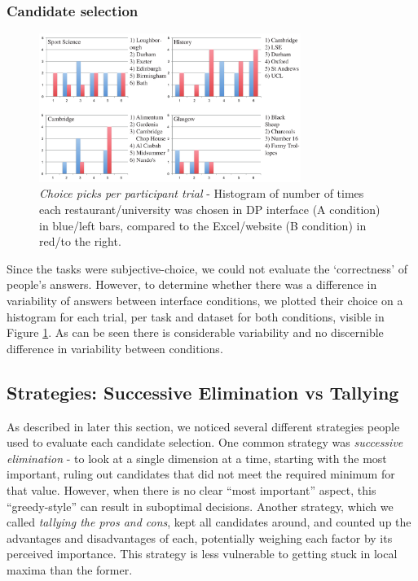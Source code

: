 \documentclass{sigchi}
\begin{document}
\subsubsection{Candidate selection}

\begin{figure}[htb]
\begin{center}
\includegraphics[width=8.5cm]{img/results}
\caption{\emph{Choice picks per participant trial} - Histogram of number of times each restaurant/university was chosen in DP interface (A condition) in blue/left bars, compared to the Excel/website (B condition) in red/to the right.}
\label{fig:chosen_results}
\end{center}
\end{figure}

Since the tasks were subjective-choice, we could not evaluate the `correctness' of people's answers.  However, to determine whether there was a difference in variability of answers between interface conditions, we plotted their choice on a histogram for each trial, per task and dataset for both conditions, visible in Figure \ref{fig:chosen_results}.  As can be seen there is considerable variability and no discernible difference in variability between conditions.  

\subsection{Strategies: Successive Elimination vs Tallying}
As described in later this section, we noticed several different strategies people used to evaluate each candidate selection. One common strategy was \emph{successive elimination} - to look at a single dimension at a time, starting with the most important, ruling out candidates that did not meet the required minimum for that value.  However, when there is no clear ``most important'' aspect, this  ``greedy-style'' can result in suboptimal decisions.  Another strategy, which we called \emph{tallying the pros and cons}, kept all candidates around, and counted up the advantages and disadvantages of each, potentially weighing each factor by its perceived importance.  This strategy is less vulnerable to getting stuck in local maxima than the former.
\end{document}
